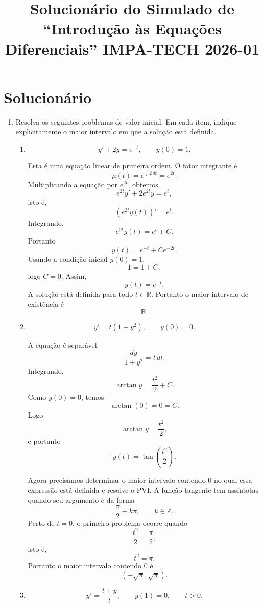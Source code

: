 \documentclass[a4paper,11pt,reqno]{amsart}
\title{Solucionário do Simulado de ``Introdução às Equações Diferenciais''  IMPA-TECH 2026-01}
\begin{document}
\maketitle

\section*{Solucionário}

\begin{enumerate}

\item Resolva os seguintes problemas de valor inicial. Em cada item, indique explicitamente o maior intervalo em que a solução está definida.

\begin{enumerate}

\item
\[
    y'+2y=e^{-t},
    \qquad
    y(0)=1.
\]

Esta é uma equação linear de primeira ordem. O fator integrante é
\[
    \mu(t)=e^{\int 2\,dt}=e^{2t}.
\]
Multiplicando a equação por $e^{2t}$, obtemos
\[
    e^{2t}y'+2e^{2t}y=e^t,
\]
isto é,
\[
    \left(e^{2t}y(t)\right)'=e^t.
\]
Integrando,
\[
    e^{2t}y(t)=e^t+C.
\]
Portanto
\[
    y(t)=e^{-t}+Ce^{-2t}.
\]
Usando a condição inicial $y(0)=1$,
\[
    1=1+C,
\]
logo $C=0$. Assim,
\[
    \boxed{y(t)=e^{-t}.}
\]
A solução está definida para todo $t\in\mathbb{R}$. Portanto o maior intervalo de existência é
\[
    \boxed{\mathbb{R}.}
\]

\item
\[
    y'=t(1+y^2),
    \qquad
    y(0)=0.
\]

A equação é separável:
\[
    \frac{dy}{1+y^2}=t\,dt.
\]
Integrando,
\[
    \arctan y=\frac{t^2}{2}+C.
\]
Como $y(0)=0$, temos
\[
    \arctan(0)=0=C.
\]
Logo
\[
    \arctan y=\frac{t^2}{2},
\]
e portanto
\[
    \boxed{y(t)=\tan\left(\frac{t^2}{2}\right).}
\]

Agora precisamos determinar o maior intervalo contendo $0$ no qual essa expressão está definida e resolve o PVI. A função tangente tem assíntotas quando seu argumento é da forma
\[
    \frac{\pi}{2}+k\pi,
    \qquad k\in\mathbb{Z}.
\]
Perto de $t=0$, o primeiro problema ocorre quando
\[
    \frac{t^2}{2}=\frac{\pi}{2},
\]
isto é,
\[
    t^2=\pi.
\]
Portanto o maior intervalo contendo $0$ é
\[
    \boxed{(-\sqrt{\pi},\sqrt{\pi}).}
\]

\item
\[
    y'=\frac{t+y}{t},
    \qquad
    y(1)=0,
    \qquad
    t>0.
\]


\end{enumerate}
\end{enumerate}
\end{document}

